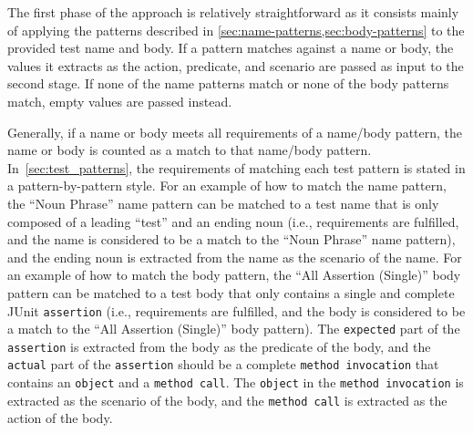 \documentclass[proposal.tex]{subfiles}
\begin{document}
The first phase of the approach is relatively straightforward as it consists mainly of applying the patterns described in \cref{sec:name-patterns,sec:body-patterns} to the provided test name and body.
%
If a pattern matches against a name or body, the values it extracts as the action, predicate, and scenario are passed as input to the second stage.
%
If none of the name patterns match or none of the body patterns match, empty values are passed instead.


Generally, if a name or body meets all requirements of a name\slash body pattern, the name or body is counted as a match to that name\slash body pattern.
%
In~\cref{sec:test_patterns}, the requirements of matching each test pattern is stated in a pattern-by-pattern style.
%
For an example of how to match the name pattern, the \enquote{Noun Phrase} name pattern can be matched to a test name that is only composed of a leading \enquote{test} and an ending noun (i.e., requirements are fulfilled, and the name is considered to be a match to the \enquote{Noun Phrase} name pattern), and the ending noun is extracted from the name as the scenario of the name.
%
For an example of how to match the body pattern, the \enquote{All Assertion (Single)} body pattern can be matched to a test body that only contains a single and complete JUnit \texttt{assertion} (i.e., requirements are fulfilled, and the body is considered to be a match to the \enquote{All Assertion (Single)} body pattern).
%
The \texttt{expected} part of the \texttt{assertion} is extracted from the body as the predicate of the body, and the \texttt{actual} part of the \texttt{assertion} should be a complete \texttt{method invocation} that contains an \texttt{object} and a \texttt{method call}.
%
The \texttt{object} in the \texttt{method invocation} is extracted as the scenario of the body, and the \texttt{method call} is extracted as the action of the body.
\end{document}
